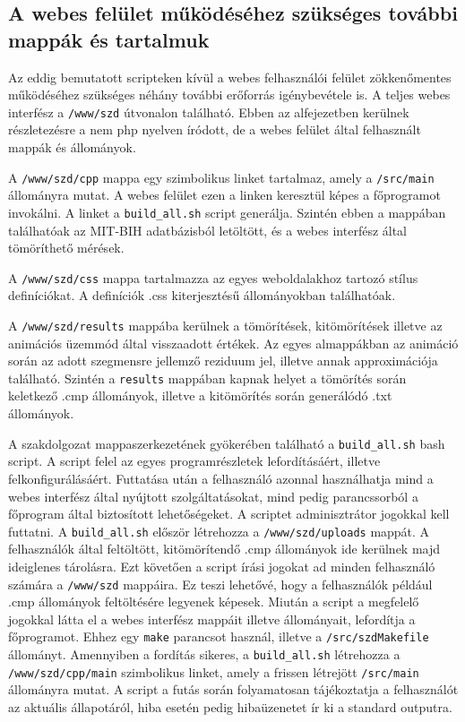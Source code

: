 \documentclass[oneside,titlepage,12pt,a4paper]{report}
\begin{document}
\subsection{A webes felület működéséhez szükséges további mappák és tartalmuk}

Az eddig bemutatott scripteken kívül a webes felhasználói felület zökkenőmentes működéséhez szükséges néhány további erőforrás igénybevétele is. A teljes webes interfész a \texttt{/www/szd} útvonalon található. Ebben az alfejezetben kerülnek részletezésre a nem php nyelven íródott, de a webes felület által felhasznált mappák és állományok.

\par A \texttt{/www/szd/cpp} mappa egy szimbolikus linket tartalmaz, amely a \texttt{/src/main} állományra mutat. A webes felület ezen a linken keresztül képes a főprogramot invokálni. A linket a \texttt{build\_all.sh} script generálja. Szintén ebben a mappában találhatóak az MIT-BIH adatbázisból letöltött, és a webes interfész által tömöríthető mérések. 
\par A \texttt{/www/szd/css} mappa tartalmazza az egyes weboldalakhoz tartozó stílus definíciókat. A definíciók .css kiterjesztésű állományokban találhatóak.
\par A \texttt{/www/szd/results} mappába kerülnek a tömörítések, kitömörítések illetve az animációs üzemmód által visszaadott értékek. Az egyes almappákban az animáció során az adott szegmensre jellemző reziduum jel, illetve annak approximációja található. Szintén a \texttt{results} mappában kapnak helyet a tömörítés során keletkező .cmp állományok, illetve a kitömörítés során generálódó .txt állományok. 

\par A szakdolgozat mappaszerkezetének gyökerében található a \texttt{build\_all.sh} bash script. A script felel az egyes programrészletek lefordításáért, illetve felkonfigurálásáért. Futtatása után a felhasználó azonnal használhatja mind a webes interfész által nyújtott szolgáltatásokat, mind pedig parancssorból a főprogram által biztosított lehetőségeket. A scriptet adminisztrátor jogokkal kell futtatni. A \texttt{build\_all.sh} először létrehozza a \texttt{/www/szd/uploads} mappát. A felhasználók által feltöltött, kitömörítendő .cmp állományok ide kerülnek majd ideiglenes tárolásra. Ezt követően a script 
írási jogokat ad minden felhasználó számára a \texttt{/www/szd} mappáira. Ez teszi lehetővé, hogy a felhasználók például .cmp állományok feltöltésére legyenek képesek. Miután a script a megfelelő jogokkal látta el a webes interfész mappáit illetve állományait, lefordítja a főprogramot. Ehhez egy \texttt{make} parancsot használ, illetve a \texttt{/src/szdMakefile} állományt. Amennyiben a fordítás sikeres, a \texttt{build\_all.sh} létrehozza a \texttt{/www/szd/cpp/main} szimbolikus linket, amely a frissen létrejött \texttt{/src/main} állományra mutat. A script a futás során folyamatosan tájékoztatja a felhasználót az aktuális állapotáról, hiba esetén pedig hibaüzenetet ír ki a standard outputra.  
\end{document}
